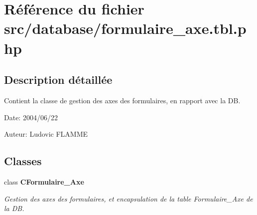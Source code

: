 \section{Référence du fichier src/database/formulaire\_\-axe.tbl.php}
\label{formulaire__axe_8tbl_8php}


\subsection{Description détaillée}
Contient la classe de gestion des axes des formulaires, en rapport avec la DB. 

\begin{Desc}
\item[Date:]2004/06/22\end{Desc}
\begin{Desc}
\item[Auteur:]Ludovic FLAMME \end{Desc}


\subsection*{Classes}
\begin{CompactItemize}
\item 
class {\bf CFormulaire\_\-Axe}
\begin{CompactList}\small\item\em Gestion des axes des formulaires, et encapsulation de la table Formulaire\_\-Axe de la DB. \item\end{CompactList}\end{CompactItemize}
